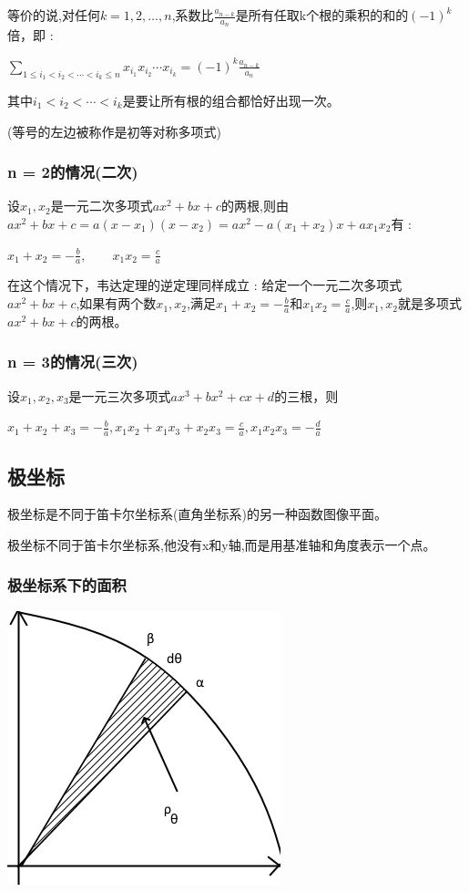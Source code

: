 \documentclass[UTF8]{ctexbook}
\begin{document}
{{{{等价的说,对任何$k = 1,2,\dots,n$,系数比$\frac{a_{n-k}}{a_n}$是所有任取k个根的乘积的和的$(-1)^k$倍，即 :

$\sum\limits_{1 \leq i_1 < i_2 < \dotsm < i_k \leq n}x_{i_{1}}x_{i_{2}} \dotsm x_{i_{k}} = (-1)^k\frac{a_{n-k}}{a_n}$

其中$i_1 < i_2 < \dotsm < i_k$是要让所有根的组合都恰好出现一次。

(等号的左边被称作是初等对称多项式)
}%

\subsubsection{n = 2的情况(二次)}{
  设$x_1,x_2$是一元二次多项式$ax^2 + bx + c$的两根,则由$ax^2 +bx + c = a(x - x_1)(x - x_2) = ax^2 - a(x_1 + x_2)x + ax_1x_2$有 :

  $x_1 + x_2 = -\frac{b}{a},\qquad x_1x_2 = \frac{c}{a}$

  在这个情况下，韦达定理的逆定理同样成立 : 给定一个一元二次多项式$ax^2 + bx + c$,如果有两个数$x_1,x_2$,满足$x_1 + x_2 = -\frac{b}{a}$和$x_1x_2 = \frac{c}{a}$,则$x_1,x_2$就是多项式$ax^2 + bx + c$的两根。
}%

\subsubsection{n = 3的情况(三次)}{
  设$x_1,x_2,x_3$是一元三次多项式$ax^3 + bx^2 + cx + d$的三根，则

  $x_1 + x_2 + x_3 = -\frac{b}{a}, x_1x_2 + x_1x_3 + x_2x_3 = \frac{c}{a},x_1x_2x_3 = -\frac{d}{a}$
}%

}%

\subsection{极坐标}{
极坐标是不同于笛卡尔坐标系(直角坐标系)的另一种函数图像平面。

极坐标不同于笛卡尔坐标系,他没有x和y轴,而是用基准轴和角度表示一个点。

\subsubsection{极坐标系下的面积}{
  \includegraphics{resources/polar_coordness.png}

}}}}
\end{document}
